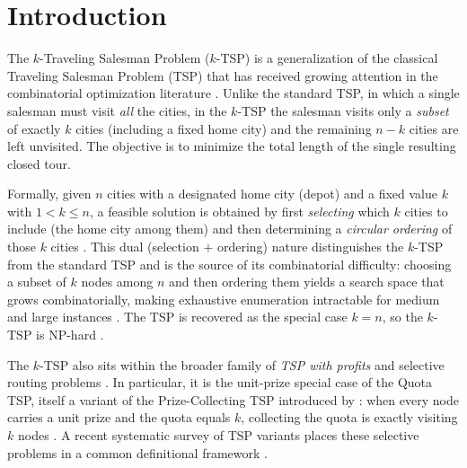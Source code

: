 \documentclass[sn-chicago]{sn-jnl}
\begin{document}
\section{Introduction}\label{sec:intro}

The $k$-Traveling Salesman Problem ($k$-TSP) is a generalization of the classical
Traveling Salesman Problem (TSP) that has received growing attention in the
combinatorial optimization literature \citep{venkatesh2018,pandiri2020,ene2017,blanchard2023}.
Unlike the standard TSP, in which a single salesman must visit \emph{all} the
cities, in the $k$-TSP the salesman visits only a \emph{subset} of exactly $k$
cities (including a fixed home city) and the remaining $n-k$ cities are left
unvisited. The objective is to minimize the total length of the single resulting
closed tour.

Formally, given $n$ cities with a designated home city (depot) and a fixed value
$k$ with $1 < k \le n$, a feasible solution is obtained by first \emph{selecting}
which $k$ cities to include (the home city among them) and then determining a
\emph{circular ordering} of those $k$ cities \citep{venkatesh2018}. This dual
(selection $+$ ordering) nature distinguishes the $k$-TSP from the standard TSP
and is the source of its combinatorial difficulty: choosing a subset of $k$ nodes
among $n$ and then ordering them yields a search space that grows combinatorially,
making exhaustive enumeration intractable for medium and large instances
\citep{lawler1985}. The TSP is recovered as the special case $k=n$, so the $k$-TSP
is NP-hard \citep{rego2011tsp}.

The $k$-TSP also sits within the broader family of \emph{TSP with profits} and
selective routing problems \citep{feillet2005profits}. In particular, it is the
unit-prize special case of the Quota TSP, itself a variant of the Prize-Collecting
TSP introduced by \citet{balas1989pctsp}: when every node carries a unit prize and
the quota equals $k$, collecting the quota is exactly visiting $k$ nodes
\citep{bienstock1993pctsp}. A recent systematic survey of TSP variants places these
selective problems in a common definitional framework \citep{tspt3co2025}.
\end{document}
